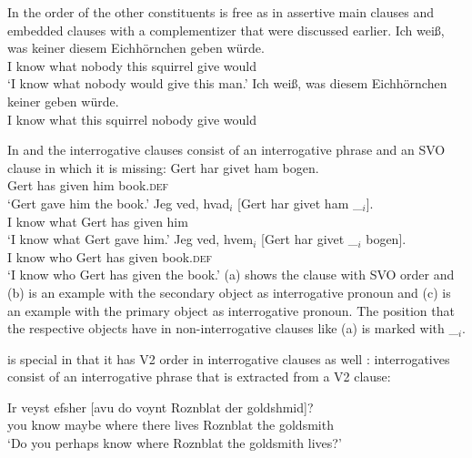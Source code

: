 In  the order of the other constituents is free as in assertive main clauses and embedded
clauses with a complementizer that were discussed earlier. 
\eal
\ex
\gll Ich weiß, was keiner diesem Eichhörnchen geben würde.\\
     I know    what nobody this squirrel give would\\
\glt `I know what nobody would give this man.'
\ex 
\gll Ich weiß, was diesem Eichhörnchen keiner geben würde.\\
     I know what this squirrel nobody give would\\
\zl

\noindent
In  and  the interrogative clauses consist of an interrogative phrase and an SVO clause
in which it is missing:
\eal
\ex 
\gll Gert har givet ham bogen.\\
     Gert has given him book.\textsc{def}\\
\glt `Gert gave him the book.'
\ex
\gll Jeg ved, hvad$_i$ [Gert har givet ham \_$_i$].\\
     I know what \spacebr{}Gert has given him\\
\glt `I know what Gert gave him.'
\ex
\gll Jeg ved, hvem$_i$ [Gert har givet \_$_i$   bogen].\\
     I know who        \spacebr{}Gert has given {} book.\textsc{def}\\
\glt `I know who Gert has given the book.'
\zl
(a) shows the clause with SVO order and (b) is an example with the secondary object as
interrogative pronoun and (c) is an example with the primary object as interrogative
pronoun. The position that the respective objects have in non-interrogative clauses like (a)
is marked with \_$_i$.

 is special in that it has V2 order in interrogative clauses as well \citep[Sections~4.1, 4.2]{Diesing90a}: interrogatives
consist of an interrogative phrase that is extracted from a V2 clause:

\ea
\gll Ir veyst efsher [avu            do    voynt Roznblat   der goldshmid]?\footnotemark\\
     you know maybe  \spacebr{}where there lives Roznblat the goldsmith\\
\glt `Do you perhaps know where Roznblat the goldsmith lives?' 
\z
%


